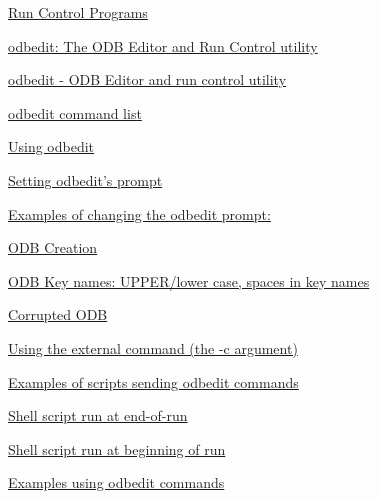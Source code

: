 \begin{TabularC}{2}
\begin{TabularC}{2}
\begin{DoxyItemize}
\item \hyperlink{RC_run_control}{Run Control Programs} 
\begin{DoxyItemize}
\item \hyperlink{RC_odbedit}{odbedit: The ODB Editor and Run Control utility} 
\begin{DoxyItemize}
\item \hyperlink{RC_odbedit_utility}{odbedit -\/ ODB Editor and run control utility} 
\begin{DoxyItemize}
\item \hyperlink{RC_odbedit_utility_RC_odbedit_help}{odbedit command list} 
\end{DoxyItemize}
\item \hyperlink{RC_odbedit_examples}{Using odbedit} 
\begin{DoxyItemize}
\item \hyperlink{RC_odbedit_examples_RC_odbedit_prompt}{Setting odbedit's prompt} 
\begin{DoxyItemize}
\item \hyperlink{RC_odbedit_examples_RC_odbedit_prompt_examples}{Examples of changing the odbedit prompt:} 
\end{DoxyItemize}
\item \hyperlink{RC_odbedit_examples_RC_odbedit_create_ODB}{ODB Creation} 
\item \hyperlink{RC_odbedit_examples_RC_odbedit_keynames}{ODB Key names: UPPER/lower case, spaces in key names} 
\item \hyperlink{RC_odbedit_examples_RC_odbedit_corrupted}{Corrupted ODB} 
\begin{DoxyItemize}
\item \hyperlink{RC_odbedit_examples_RC_odbedit_extcommand}{Using the external command (the -\/c argument)} 
\item \hyperlink{RC_odbedit_examples_RC_odbedit_script_examples}{Examples of scripts sending odbedit commands} 
\begin{DoxyItemize}
\item \hyperlink{RC_odbedit_examples_RC_example_script_1}{Shell script run at end-\/of-\/run} 
\item \hyperlink{RC_odbedit_examples_RC_example_script_2}{Shell script run at beginning of run} 
\end{DoxyItemize}
\end{DoxyItemize}
\item \hyperlink{RC_odbedit_examples_RC_odbedit_cmd_examples}{Examples using odbedit commands} 
\begin{DoxyItemize}

\end{DoxyItemize}
\end{DoxyItemize}
\end{DoxyItemize}
\end{DoxyItemize}
\end{DoxyItemize}
\end{TabularC}
\end{TabularC}
